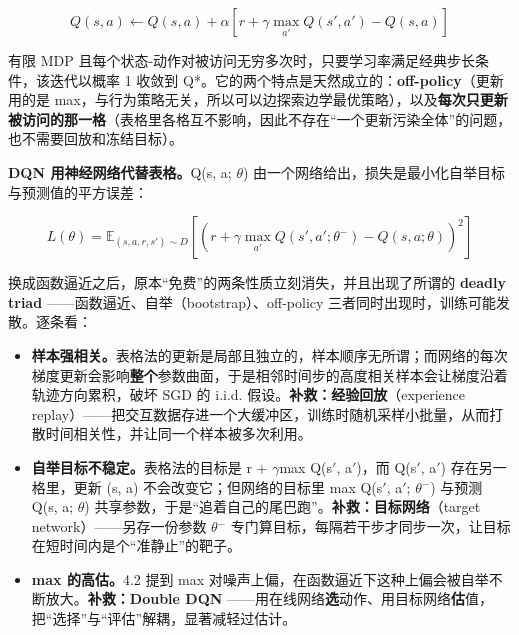 \documentclass[11pt,a4paper]{ctexart}
\begin{document}
\begin{equation}Q(s,a)\leftarrow Q(s,a)+\alpha\left[r+\gamma\max_{a'}Q(s',a')-Q(s,a)\right]\end{equation}

有限 MDP 且每个状态-动作对被访问无穷多次时，只要学习率满足经典步长条件，该迭代以概率 1 收敛到 Q*。它的两个特点是天然成立的：\textbf{off-policy}（更新用的是 max，与行为策略无关，所以可以边探索边学最优策略），以及\textbf{每次只更新被访问的那一格}（表格里各格互不影响，因此不存在“一个更新污染全体”的问题，也不需要回放和冻结目标）。\par

\textbf{DQN 用神经网络代替表格。}Q(s, a; $\theta$) 由一个网络给出，损失是最小化自举目标与预测值的平方误差：\par

\begin{equation}L(\theta)=\mathbb{E}_{(s,a,r,s')\sim D}\left[\left(r+\gamma\max_{a'}Q(s',a';\theta^{-})-Q(s,a;\theta)\right)^{2}\right]\end{equation}

换成函数逼近之后，原本“免费”的两条性质立刻消失，并且出现了所谓的 \textbf{deadly triad} ——函数逼近、自举（bootstrap）、off-policy 三者同时出现时，训练可能发散。逐条看：\par

\begin{itemize}[leftmargin=1.6em,itemsep=0.15em,topsep=0.25em]

\item \textbf{样本强相关。}表格法的更新是局部且独立的，样本顺序无所谓；而网络的每次梯度更新会影响\textbf{整个}参数曲面，于是相邻时间步的高度相关样本会让梯度沿着轨迹方向累积，破坏 SGD 的 i.i.d. 假设。\textbf{补救：经验回放}（experience replay）——把交互数据存进一个大缓冲区，训练时随机采样小批量，从而打散时间相关性，并让同一个样本被多次利用。

\item \textbf{自举目标不稳定。}表格法的目标是 r + $\gamma$max Q(s$'$, a$'$)，而 Q(s$'$, a$'$) 存在另一格里，更新 (s, a) 不会改变它；但网络的目标里 max Q(s$'$, a$'$; $\theta$$^{-}$) 与预测 Q(s, a; $\theta$) 共享参数，于是“追着自己的尾巴跑”。\textbf{补救：目标网络}（target network）——另存一份参数 $\theta$$^{-}$ 专门算目标，每隔若干步才同步一次，让目标在短时间内是个“准静止”的靶子。

\item \textbf{max 的高估。}4.2 提到 max 对噪声上偏，在函数逼近下这种上偏会被自举不断放大。\textbf{补救：Double DQN} ——用在线网络\textbf{选}动作、用目标网络\textbf{估}值，把“选择”与“评估”解耦，显著减轻过估计。

\end{itemize}
\end{document}
